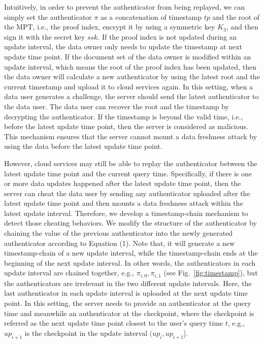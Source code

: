 Intuitively, in order to prevent the authenticator from being replayed, we can simply set the authenticator $\pi$ as a concatenation of timestamp $tp$ and the root of the MPT, i.e., the proof index, encrypt it by using a symmetric key $K_3$, and then sign it with the secret key $ssk$. If the proof index is not updated during an update interval, the data owner only needs to update the timestamp at next update time point. If the document set of the data owner is modified within an update interval, which means the root of the proof index has been updated, then the data owner will calculate a new authenticator by using the latest root and the current timestamp and upload it to cloud services again. %
In this setting, when a data user generates a challenge, the server should send the latest authenticator to the data user. The data user can recover the root and the timestamp by decrypting the authenticator. If the timestamp is beyond the valid time, i.e., before the latest update time point, then the server is considered as malicious. This mechanism ensures that the server cannot mount a data freshness attack by using the data before the latest update time point.

However, cloud services may still be able to replay the authenticator between the latest update time point and the current query time. Specifically, if there is one or more data updates happened after the latest update time point, then the server can cheat the data user by sending any authenticator uploaded after the latest update time point and then mounts a data freshness attack within the latest update interval.
Therefore, we develop a timestamp-chain mechanism to detect those cheating behaviors. We modify the structure of the authenticator by chaining the value of the previous authenticator into the newly generated authenticator according to Equation (1). Note that, it will generate a new timestamp-chain of a new update interval, while the timestamp-chain ends at the beginning of the next update interval. In other words, the authenticators in each update interval are chained together, e.g., $\pi_{i, 0}, \pi_{i, 1}$ (see Fig.~\ref{fig:timestamp}), but the authenticators are irrelevant in the two different update intervals. Here, the last authenticator in each update interval is uploaded at the next update time point. In this setting, the server needs to provide an authenticator at the query time and meanwhile an authenticator at the checkpoint, where the checkpoint is referred as the next update time point closest to the user's query time $t$, e.g., $up_{i+1}$ is the checkpoint in the update interval $(up_i,up_{i+1}]$.

